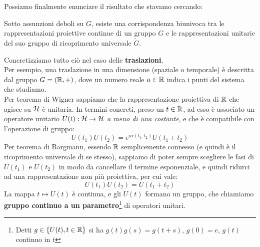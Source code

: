 \documentclass[../../FisicaTeorica.tex]{subfiles}
\begin{document}
Possiamo finalmente enunciare il risultato che stavamo cercando:
\begin{thm}
Sotto assunzioni deboli su $G$, esiste una corrispondenza biunivoca tra le rappresentazioni proiettive continue di un gruppo $G$ e le rappresentazioni unitarie del suo gruppo di ricoprimento universale $\widetilde{G}$.
\end{thm}

Concretizziamo tutto ciò nel caso delle \textbf{traslazioni}.\\
Per esempio, una traslazione in una dimensione (spaziale o temporale) è descritta dal gruppo $G=(\mathbb{R},+)$, dove un numero reale $a\in \mathbb{R}$ indica  i punti del sistema che studiamo.\\
Per teorema di Wigner sappiamo che la rappresentazione proiettiva di $\mathbb{R}$ che agisce su $\mathcal{H}$ è unitaria. In termini concreti, preso un $t\in \mathbb{R}$, ad esso è associato un operatore unitario $U(t): \mathcal{H} \to \mathcal{H}$ \textit{a meno di una costante}, e che è compatibile con l'operazione di gruppo: 
\[
U\left(t_1\right)U\left(t_2\right)=e^{i\alpha\left(t_1,t_2\right)}U\left(t_1+t_2\right)
\]
Per teorema di Bargmann, essendo $\mathbb{R}$ semplicemente connesso (e quindi è il ricoprimento universale di se stesso), sappiamo di poter sempre scegliere le fasi di $U(t_1)$ e $U(t_2)$ in modo da cancellare il termine esponenziale, e quindi ridurci ad una rappresentazione non più proiettiva, per cui vale:
\[
U(t_1)U(t_2) = U(t_1+t_2)
\]
La mappa $t \mapsto U(t)$ è continua, e gli $U(t)$ formano un gruppo, che chiamiamo \textbf{gruppo continuo a un parametro}\footnote{Detti $g\in \{U(t), t\in \mathbb{R}\}$ si ha $g(t)g(s)=g(t+s)$, $g(0)=e$, $g(t)$ continuo in $t$} di operatori unitari.\\
\end{document}
